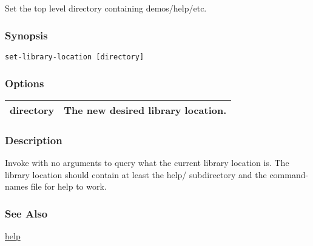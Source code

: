\subsection{}
\label{set-library-location}
Set the top level directory containing demos/help/etc. 
\subsubsection*{Synopsis}
\begin{verbatim}
set-library-location [directory] 
\end{verbatim}
\subsubsection*{Options}
\begin{tabular}{|l|l|}
\hline 
 directory  & The new desired library location.  \\
 \hline 
\end{tabular}
\subsubsection*{Description}
 Invoke with no arguments to query what the current library location is. The library location should contain at least the help/ subdirectory and the command-names file for help to work. 
\subsubsection*{See Also}
\hyperref[help]{help} 